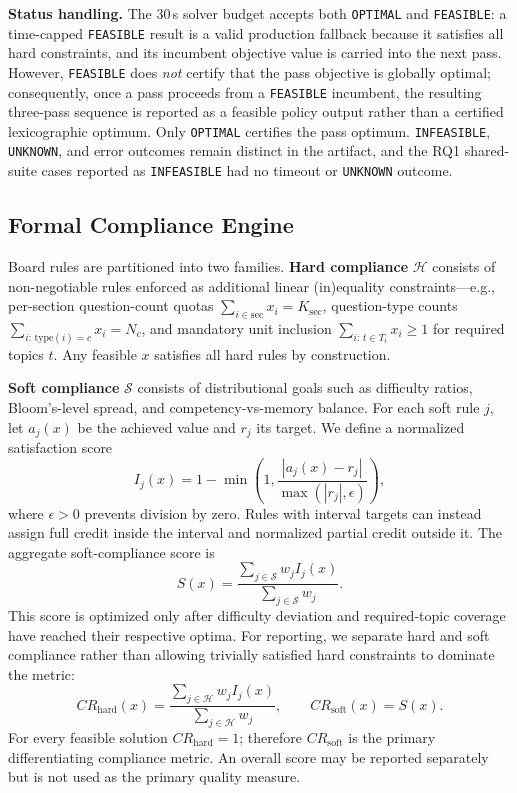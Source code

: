 \documentclass[runningheads]{llncs}
\begin{document}
\noindent\textbf{Status handling.} The 30\,s solver budget accepts both \texttt{OPTIMAL} and \texttt{FEASIBLE}: a time-capped \texttt{FEASIBLE} result is a valid production fallback because it satisfies all hard constraints, and its incumbent objective value is carried into the next pass.
However, \texttt{FEASIBLE} does \emph{not} certify that the pass objective is globally optimal;
consequently, once a pass proceeds from a \texttt{FEASIBLE} incumbent, the resulting three-pass sequence is reported as a feasible policy output rather than a certified lexicographic optimum.
Only \texttt{OPTIMAL} certifies the pass optimum. \texttt{INFEASIBLE}, \texttt{UNKNOWN}, and error outcomes remain distinct in the artifact, and the RQ1 shared-suite cases reported as \texttt{INFEASIBLE} had no timeout or \texttt{UNKNOWN} outcome.

\subsection{Formal Compliance Engine}
\label{sec:compliance}
Board rules are partitioned into two families.
\textbf{Hard compliance} $\mathcal{H}$ consists of non-negotiable rules enforced as additional linear (in)equality constraints---e.g., per-section question-count quotas $\sum_{i\in\text{sec}}x_i=K_{\text{sec}}$, question-type counts $\sum_{i:\,\text{type}(i)=c}x_i=N_c$, and mandatory unit inclusion $\sum_{i:\,t\in T_i}x_i\ge1$ for required topics $t$.
Any feasible $x$ satisfies all hard rules by construction.

\textbf{Soft compliance} $\mathcal{S}$ consists of distributional goals such as difficulty ratios, Bloom's-level spread, and competency-vs-memory balance.
For each soft rule $j$, let $a_j(x)$ be the achieved value and $r_j$ its target.
We define a normalized satisfaction score
\begin{equation}
I_j(x)=1-\min\left(1,\frac{|a_j(x)-r_j|}{\max(|r_j|,\epsilon)}\right),
\end{equation}
where $\epsilon>0$ prevents division by zero.
Rules with interval targets can instead assign full credit inside the interval and normalized partial credit outside it.
The aggregate soft-compliance score is
\begin{equation}
S(x)=\frac{\sum_{j\in\mathcal{S}}w_j I_j(x)}{\sum_{j\in\mathcal{S}}w_j}.
\end{equation}
This score is optimized only after difficulty deviation and required-topic coverage have reached their respective optima.
For reporting, we separate hard and soft compliance rather than allowing trivially satisfied hard constraints to dominate the metric:
\begin{equation}
CR_{\mathrm{hard}}(x)=\frac{\sum_{j\in\mathcal{H}}w_jI_j(x)}{\sum_{j\in\mathcal{H}}w_j},\qquad
CR_{\mathrm{soft}}(x)=S(x).
\end{equation}
For every feasible solution $CR_{\mathrm{hard}}=1$; therefore $CR_{\mathrm{soft}}$ is the primary differentiating compliance metric.
An overall score may be reported separately but is not used as the primary quality measure.
\end{document}
